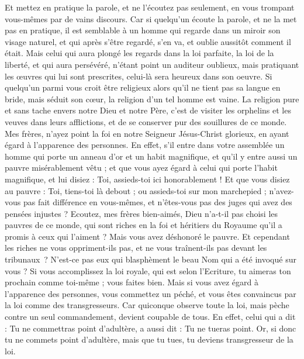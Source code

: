 \begin{multicols}{2}
Et mettez en pratique la parole, et ne l'écoutez pas seulement, en vous trompant vous-mêmes par de vains discours.
Car si quelqu'un écoute la parole, et ne la met pas en pratique, il est semblable à un homme qui regarde dans un miroir son visage naturel,
et qui après s'être regardé, s'en va, et oublie aussitôt comment il était.
Mais celui qui aura plongé les regards dans la loi parfaite, la loi de la liberté, et qui aura persévéré, n'étant point un auditeur oublieux, mais pratiquant les œuvres qui lui sont prescrites, celui-là sera heureux dans son oeuvre.
Si quelqu'un parmi vous croit être religieux alors qu’il ne tient pas sa langue en bride, mais séduit son cœur, la religion d'un tel homme est vaine.
La religion pure et sans tache envers notre Dieu et notre Père, c'est de visiter les orphelins et les veuves dans leurs afflictions, et de se conserver pur des souillures de ce monde.
\VerseOne{}Mes frères, n’ayez point la foi en notre Seigneur Jésus-Christ glorieux, en ayant égard à l’apparence des personnes.
En effet, s'il entre dans votre assemblée un homme qui porte un anneau d'or et un habit magnifique, et qu’il y entre aussi un pauvre misérablement vêtu ;
et que vous ayez égard à celui qui porte l’habit magnifique, et lui disiez : Toi, assieds-toi ici honorablement ! Et que vous disiez au pauvre : Toi, tiens-toi là debout ; ou assieds-toi sur mon marchepied ;
n’avez-vous pas fait différence en vous-mêmes, et n’êtes-vous pas des juges qui avez des pensées injustes ?
Ecoutez, mes frères bien-aimés, Dieu n'a-t-il pas choisi les pauvres de ce monde, qui sont riches en la foi et héritiers du Royaume qu'il a promis à ceux qui l'aiment ?
Mais vous avez déshonoré le pauvre. Et cependant les riches ne vous oppriment-ils pas, et ne vous traînent-ils pas devant les tribunaux ?
N’est-ce pas eux qui blasphèment le beau Nom qui a été invoqué sur vous ?
Si vous accomplissez la loi royale, qui est selon l'Ecriture, tu aimeras ton prochain comme toi-même ; vous faites bien.
Mais si vous avez égard à l'apparence des personnes, vous commettez un péché, et vous êtes convaincus par la loi comme des transgresseurs.
Car quiconque observe toute la loi, mais pèche contre un seul commandement, devient coupable de tous.
En effet, celui qui a dit : Tu ne commettras point d’adultère, a aussi dit : Tu ne tueras point. Or, si donc tu ne commets point d’adultère, mais que tu tues, tu deviens transgresseur de la loi.

\end{multicols}
